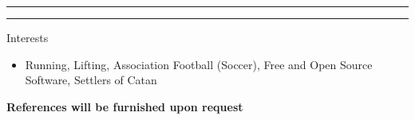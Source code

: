\documentclass[10pt]{letter}
\begin{document}
\rule{\linewidth}{.5pt}

\vspace{-15pt}

\rule{\linewidth}{.5pt}

{\Large Interests}\vspace{-5pt}
\begin{itemize}
\setlength\itemsep{1pt}
\item Running, Lifting, Association Football (Soccer), Free and Open Source Software, Settlers of Catan
\end{itemize}
\begin{center}\textbf{References will be furnished upon request}\end{center}
\end{document}
